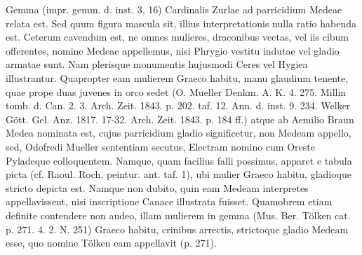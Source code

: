 \documentclass[landscape, a4paper, 11pt, oneside, polutonikogreek, german]{article}
\begin{document}
Gemma (impr. gemm. d. inst. 3, 16) Cardinalis Zurlae ad parricidium Medeae relata est. Sed quum figura mascula sit, illius interpretationis nulla ratio habenda est. Ceterum cavendum est, ne omnes mulieres, draconibus vectas, vel iis cibum offerentes, nomine Medeae appellemus, nisi Phrygio vestitu indutae vel gladio armatae sunt. Nam plerisque monumentis hujusmodi Ceres vel Hygiea illustrantur. Quapropter eam mulierem Graeco habitu, manu glaudium tenente, quae prope duas juvenes in orco sedet (O. Mueller Denkm. A. K. 4. 275. Millin tomb. d. Can. 2. 3. Arch. Zeit. 1843. p. 202. taf. 12. Ann. d. inst. 9. 234. Welker Gött. Gel. Anz. 1817. 17-32. Arch. Zeit. 1843. p. 184 ff.) atque ab Aemilio Braun Medea nominata est, cujus parricidium gladio significetur, non Medeam appello, sed, Odofredi Mueller sententiam secutus, Electram nomino cum Oreste Pyladeque colloquentem. Namque, quam facilius falli possimus, apparet e tabula picta (cf. Raoul. Roch. peintur. ant. taf. 1), ubi mulier Graeco habitu, gladioque stricto depicta est. Namque non dubito, quin eam Medeam interpretes appellavissent, nisi inscriptione Canace illustrata fuisset. Quamobrem etiam definite contendere non audeo, illam mulierem in gemma (Mus. Ber. Tölken cat. p. 271. 4. 2. N. 251) Graeco habitu, crinibus arrectis, strictoque gladio Medeam esse, quo nomine Tölken eam appellavit (p. 271).
\end{document}
